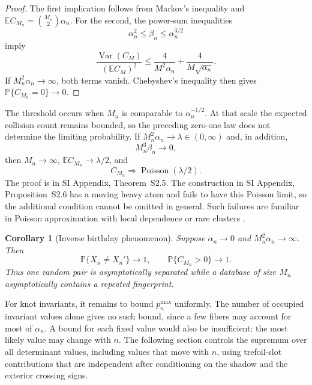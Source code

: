 \documentclass[9pt,twoside]{pnas-new}
\newtheorem{corollary}[theorem]{Corollary}
\theoremstyle{definition}
\theoremstyle{remark}
\renewcommand{\Pr}{\mathbb{P}}
\newcommand{\SILocation}[1]{SI Appendix, #1}
\newcommand{\SIPoissonWindow}{Theorem~S2.5}
\newcommand{\SIHeavyAtomCounterexample}{Proposition~S2.6}
\begin{document}
\begin{proof}
The first implication follows from Markov's inequality and
$\mathbb E C_{M_n}=\binom{M_n}{2}\alpha_n$.
For the second, the power-sum inequalities
\[
 \alpha_n^2\le\beta_n\le\alpha_n^{3/2}
\]
imply
\[
 \frac{\operatorname{Var}(C_M)}
 {(\mathbb E C_M)^2}
 \le
 \frac{4}{M^2\alpha_n}
 +\frac{4}{M\sqrt{\alpha_n}}.
\]
If $M_n^2\alpha_n\to\infty$, both terms vanish. Chebyshev's inequality then gives
$\Pr\{C_{M_n}=0\}\to0$.
\end{proof}

The threshold occurs when $M_n$ is comparable to $\alpha_n^{-1/2}$. At that scale the expected collision count remains bounded, so the preceding zero-one law does not determine the limiting probability. If $M_n^2\alpha_n\to\lambda\in(0,\infty)$ and, in addition,
\[
 M_n^3\beta_n\longrightarrow0,
\]
then $M_n\to\infty$, $\mathbb E C_{M_n}\to\lambda/2$, and
\[
 C_{M_n}\Longrightarrow\operatorname{Poisson}(\lambda/2).
\]
The proof is in \SILocation{\SIPoissonWindow{}}. The construction in \SILocation{\SIHeavyAtomCounterexample{}} has a moving heavy atom and fails to have this Poisson limit, so the additional condition cannot be omitted in general. Such failures are familiar in Poisson approximation with local dependence or rare clusters \cite{arratiagoldsteingordon1989,barbourholstjanson1992}.

\begin{corollary}[Inverse birthday phenomenon]\label{cor:inverse-birthday}
Suppose $\alpha_n\to0$ and $M_n^2\alpha_n\to\infty$. Then
\[
 \Pr\{X_n\ne X_n'\}\longrightarrow1,
 \qquad
 \Pr\{C_{M_n}>0\}\longrightarrow1.
\]
Thus one random pair is asymptotically separated while a database of size $M_n$ asymptotically contains a repeated fingerprint.
\end{corollary}

For knot invariants, it remains to bound $p_n^{\max}$ uniformly. The number of occupied invariant values alone gives no such bound, since a few fibers may account for most of $\alpha_n$. A bound for each fixed value would also be insufficient: the most likely value may change with $n$. The following section controls the supremum over all determinant values, including values that move with $n$, using trefoil-slot contributions that are independent after conditioning on the shadow and the exterior crossing signs.
\end{document}
